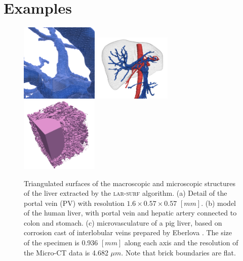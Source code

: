 
\section{Examples}\label{sec:examples}


\begin{figure}[tbp]
\includegraphics[height=0.3\textwidth,width=0.33\textwidth]{figs/image-1.png}%
\includegraphics[height=0.3\textwidth,width=0.33\textwidth]{figs/image-2.png}%
\includegraphics[height=0.3\textwidth,width=0.33\textwidth]{figs/image-3.png}%
\caption{\small Triangulated surfaces of the macroscopic and microscopic structures of the liver extracted by the \textsc{lar-surf} algorithm. 
(a) Detail of the portal vein (PV) with resolution $1.6\times0.57\times0.57$ $[mm]$.
(b) model of the human liver, with portal vein and hepatic artery connected to colon and stomach.
(c) microvasculature of a pig liver, based on corrosion cast of interlobular veins prepared by Eberlova
\cite{eberlova2017use}. The size of the specimen is 0.936 $[mm]$ along each axis and the resolution of the Micro-CT data is 4.682 $\mu{}m$. Note that brick boundaries are flat.
}
\label{fig:example_liver_macro_micro}
\end{figure}

